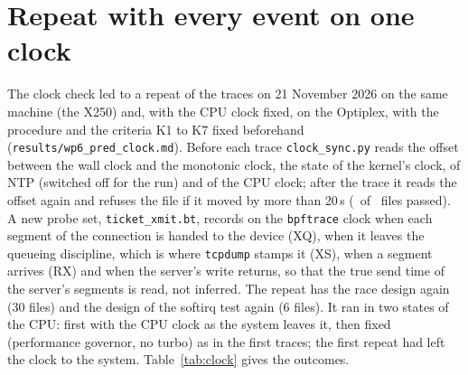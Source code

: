 \documentclass[9pt]{article}
\begin{document}
\section*{Repeat with every event on one clock}
The clock check led to a repeat of the traces on 21 November 2026 on the same machine (the X250) and, with the CPU clock fixed, on the Optiplex, with the procedure and the criteria K1 to K7 fixed beforehand (\texttt{results/wp6\_pred\_clock.md}). Before each trace \texttt{clock\_sync.py} reads the offset between the wall clock and the monotonic clock, the state of the kernel's clock, of NTP (switched off for the run) and of the CPU clock; after the trace it reads the offset again and refuses the file if it moved by more than 20\,\textmu s (\RpFiles\ of \RpFiles\ files passed). A new probe set, \texttt{ticket\_xmit.bt}, records on the \texttt{bpftrace} clock when each segment of the connection is handed to the device (XQ), when it leaves the queueing discipline, which is where \texttt{tcpdump} stamps it (XS), when a segment arrives (RX) and when the server's write returns, so that the true send time of the server's segments is read, not inferred. The repeat has the race design again (30 files) and the design of the softirq test again (6 files). It ran in two states of the CPU: first with the CPU clock as the system leaves it, then fixed (performance governor, no turbo) as in the first traces; the first repeat had left the clock to the system. Table~\ref{tab:clock} gives the outcomes.
\end{document}
